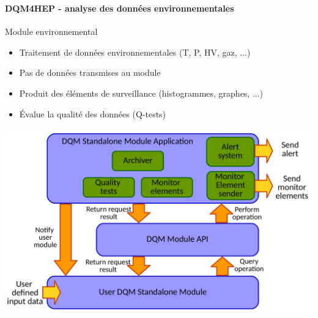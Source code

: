 \documentclass[8pt]{beamer}
\begin{document}
\begin{frame}
\begin{minipage}{0.18\textwidth}
\begin{flushright}
        \end{flushright}
      \end{minipage}
    \end{frame}

    \begin{frame}
    \frametitle{\backup}
    \framesubtitle{DQM4HEP - analyse des données environnementales}
      \begin{minipage}{0.78\textwidth}
        \begin{block}{Module environnemental}
          \begin{itemize}
            \item Traitement de données environnementales (T, P, HV, gaz, ...)
            \item Pas de données transmises au module
            \item Produit des éléments de surveillance (histogrammes, graphes, ...)
            \item Évalue la qualité des données (Q-tests)
          \end{itemize}
        \end{block}
        \begin{center}
          \includegraphics[width=0.9\linewidth]{StandaloneModuleApplicationDiagram.pdf}

\end{center}
\end{minipage}
\end{frame}
\end{document}

